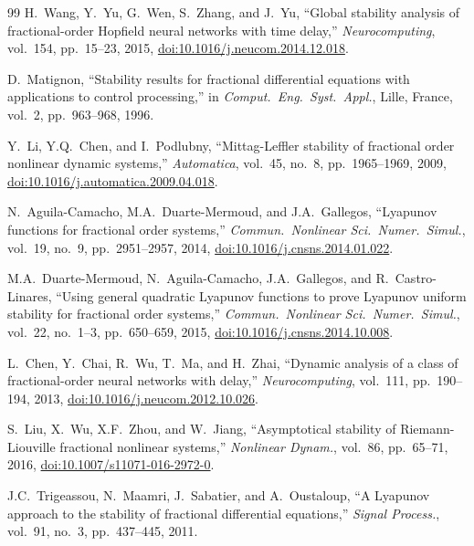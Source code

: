 \documentclass[12pt,a4paper]{article}
\begin{document}
\begin{thebibliography}{99}
H.\ Wang, Y.\ Yu, G.\ Wen, S.\ Zhang, and J.\ Yu, ``Global stability analysis of fractional-order Hopfield neural networks with time delay,'' \textit{Neurocomputing}, vol.\ 154, pp.\ 15--23, 2015, \href{https://doi.org/10.1016/j.neucom.2014.12.018}{doi:10.1016/j.neucom.2014.12.018}.

D.\ Matignon, ``Stability results for fractional differential equations with applications to control processing,'' in \textit{Comput.\ Eng.\ Syst.\ Appl.}, Lille, France, vol.\ 2, pp.\ 963--968, 1996.

Y.\ Li, Y.Q.\ Chen, and I.\ Podlubny, ``Mittag-Leffler stability of fractional order nonlinear dynamic systems,'' \textit{Automatica}, vol.\ 45, no.\ 8, pp.\ 1965--1969, 2009, \href{https://doi.org/10.1016/j.automatica.2009.04.018}{doi:10.1016/j.automatica.2009.04.018}.

N.\ Aguila-Camacho, M.A.\ Duarte-Mermoud, and J.A.\ Gallegos, ``Lyapunov functions for fractional order systems,'' \textit{Commun.\ Nonlinear Sci.\ Numer.\ Simul.}, vol.\ 19, no.\ 9, pp.\ 2951--2957, 2014, \href{https://doi.org/10.1016/j.cnsns.2014.01.022}{doi:10.1016/j.cnsns.2014.01.022}.

M.A.\ Duarte-Mermoud, N.\ Aguila-Camacho, J.A.\ Gallegos, and R.\ Castro-Linares, ``Using general quadratic Lyapunov functions to prove Lyapunov uniform stability for fractional order systems,'' \textit{Commun.\ Nonlinear Sci.\ Numer.\ Simul.}, vol.\ 22, no.\ 1–3, pp.\ 650--659, 2015, \href{https://doi.org/10.1016/j.cnsns.2014.10.008}{doi:10.1016/j.cnsns.2014.10.008}.

L.\ Chen, Y.\ Chai, R.\ Wu, T.\ Ma, and H.\ Zhai, ``Dynamic analysis of a class of fractional-order neural networks with delay,'' \textit{Neurocomputing}, vol.\ 111, pp.\ 190--194, 2013, \href{https://doi.org/10.1016/j.neucom.2012.10.026}{doi:10.1016/j.neucom.2012.10.026}.

S.\ Liu, X.\ Wu, X.F.\ Zhou, and W.\ Jiang, ``Asymptotical stability of Riemann-Liouville fractional nonlinear systems,'' \textit{Nonlinear Dynam.}, vol.\ 86, pp.\ 65--71, 2016, \href{https://doi.org/10.1007/s11071-016-2972-0}{doi:10.1007/s11071-016-2972-0}.

J.C.\ Trigeassou, N.\ Maamri, J.\ Sabatier, and A.\ Oustaloup, ``A Lyapunov approach to the stability of fractional differential equations,'' \textit{Signal Process.}, vol.\ 91, no.\ 3, pp.\ 437--445, 2011.


\end{thebibliography}
\end{document}
